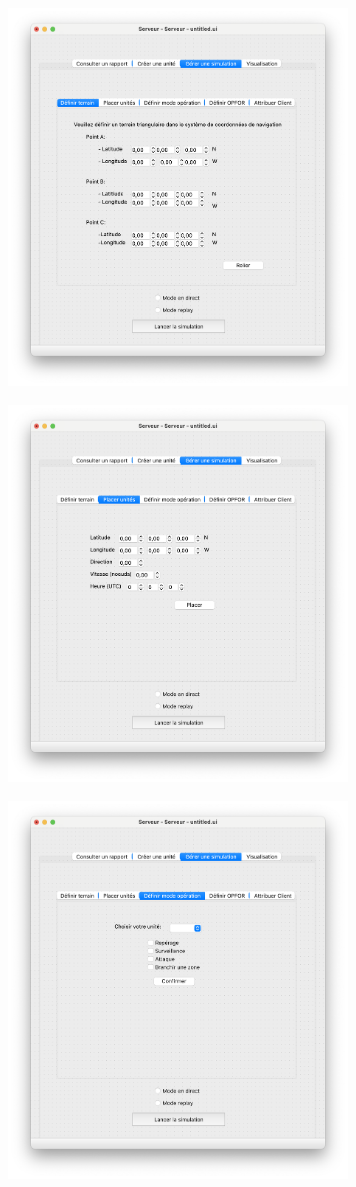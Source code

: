 \documentclass[12pt,a4paper]{scrartcl}
\theoremstyle{plain}
\theoremstyle{definition}
\theoremstyle{remark}
\begin{document}
		\begin{figure}[H]
		\centering
		\includegraphics[height=10cm]{img/maquette/serveur/3.png} 
	\end{figure}
		\begin{figure}[H]
		\centering
		\includegraphics[height=10cm]{img/maquette/serveur/4.png} 
	\end{figure}
		\begin{figure}[H]
		\centering
		\includegraphics[height=10cm]{img/maquette/serveur/5.png} 
	\end{figure}
\end{document}
